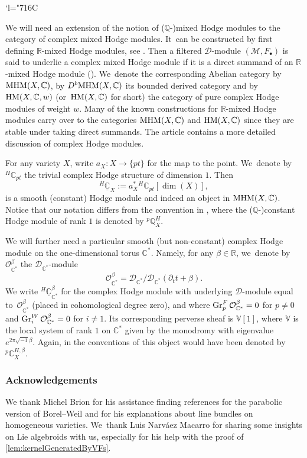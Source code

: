\documentclass[JEP,XML,SOM,Unicode,published]{cedram}
\let\mathds\mathbb
\newcommand{\Changelback}{\mathcode`l="716C}
\newcommand{\sbullet}{{\scriptscriptstyle\bullet}}
\newcommand{\dV}{{\mathds V}}
\newcommand{\dR}{{\mathds R}}\let\R\dR
\newcommand{\dC}{{\mathds C}}\let\C\dC
\newcommand{\dQ}{{\mathds Q}}\let\Q\dQ
\newcommand{\cO}{\mathcal{O}}\let\O\cO
\DeclareMathOperator{\gr}{\textup{Gr}}
\newcommand{\MHM}{\textup{MHM}}
\newcommand{\HM}{\textup{HM}}
\begin{document}
\Changelback

We will need an extension of the notion of ($\dQ$-)mixed Hodge modules to the category of complex mixed Hodge modules. It~can be constructed by first defining $\dR$\nobreakdash-mixed Hodge modules,
see \cite[\S 13.5]{Mo12}. Then a filtered $\mathscr{D}$\nobreakdash-mod\-ule $(\mathscr{M},F_\sbullet)$ is said to underlie a complex mixed Hodge module if it is a direct summand of an $\dR$-mixed Hodge module (\cite[Def.\,3.2.1.]{DS13}). We~denote the corresponding Abelian category by $\MHM(X,\dC)$, by
$D^b\MHM(X,\dC)$ its bounded derived category and by
$\HM(X,\dC,w)$ (or~$\HM(X,\dC)$ for short) the category of pure complex Hodge modules of weight $w$. Many of the known constructions for $\dR$-mixed Hodge modules carry over to the categories $\MHM(X,\dC)$ and $\HM(X,\dC)$ since they are stable under taking direct summands.
The article \cite[\S 7.1 \& App.\,A]{VilonenDavis} contains a more detailed discussion of complex Hodge modules.

For any variety $X$, write $a_X \colon X\to \{pt\}$ for the map to the point. We~denote by
${^H\!}\dC_{pt}$ the trivial complex Hodge structure of dimension $1$. Then
\[
^{H\!}\underline{\dC}_{X} := a_X^* {^H\!}\dC_{pt}[\dim(X)],
\]
is a smooth (constant) Hodge module and indeed an object in $\MHM(X,\dC)$. Notice that our notation differs from the convention in \cite{Saito1, SaitoMHM}, where the ($\dQ$-)constant Hodge module of rank $1$ is denoted by ${^p}\dQ_X^H$.

We will further need a particular smooth (but non-constant) complex Hodge module on the one-dimensional torus $\dC^*$. Namely, for any $\beta\in \dR$, we~denote by $\cO^{\beta}_{\dC^*}$ the $\mathscr{D}_{\dC^*}$\nobreakdash-mod\-ule
\[
\cO^\beta_{\dC^*} = \mathscr{D}_{\dC^*} / \mathscr{D}_{\dC^*}(\partial_t t + \beta).
\]
We write ${^H\!}\underline{\dC}^\beta_{\dC^*}$ for the complex Hodge module with underlying $\mathscr{D}$\nobreakdash-mod\-ule equal to~$\cO^\beta_{\dC^*}$ (placed in cohomological degree zero), and where
$\gr^F_p \cO^\beta_{\dC^*} = 0$ for $p \neq 0$ and $\gr^W_i \cO^\beta_{\dC^*}= 0$ for $i \neq 1$. Its corresponding perverse sheaf
is $\dV[1]$, where $\dV$ is the local system of rank $1$ on $\dC^*$ given by the monodromy with eigenvalue $e^{2\pi \sqrt{-1} \beta}$. Again, in the conventions of \cite{Saito1, SaitoMHM} this object would have been denoted by
${^p}\dC_X^{H,\beta}$.

\subsubsection*{Acknowledgements}
We thank Michel Brion for his assistance finding references for the parabolic version of Borel--Weil and for his explanations about line bundles on homogeneous varieties. We~thank Luis Narváez Macarro for sharing some insights on Lie algebroids with us, especially for his help with the proof of \cref{lem:kernelGeneratedByVFs}.
\end{document}

